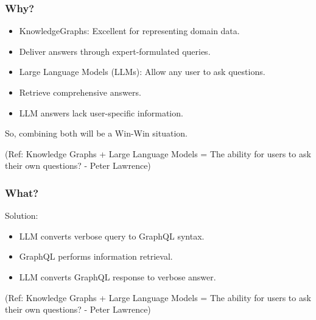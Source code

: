 \begin{frame}[fragile]\frametitle{Why?}

\begin{itemize}
\item KnowledgeGraphs: Excellent for representing domain data.
\item Deliver answers through expert-formulated queries.
\item Large Language Models (LLMs): Allow any user to ask questions.
\item Retrieve comprehensive answers.
\item LLM answers lack user-specific information.
\end{itemize}
	
So, combining both will be a Win-Win situation.

{\tiny (Ref: Knowledge Graphs + Large Language Models = The ability for users to ask their own questions? - Peter Lawrence)}

\end{frame}

\begin{frame}[fragile]\frametitle{What?}

Solution: 

\begin{itemize}
\item LLM converts verbose query to GraphQL syntax.
\item GraphQL performs information retrieval.
\item LLM converts GraphQL response to verbose answer.
\end{itemize}

	
{\tiny (Ref: Knowledge Graphs + Large Language Models = The ability for users to ask their own questions? - Peter Lawrence)}

\end{frame}

